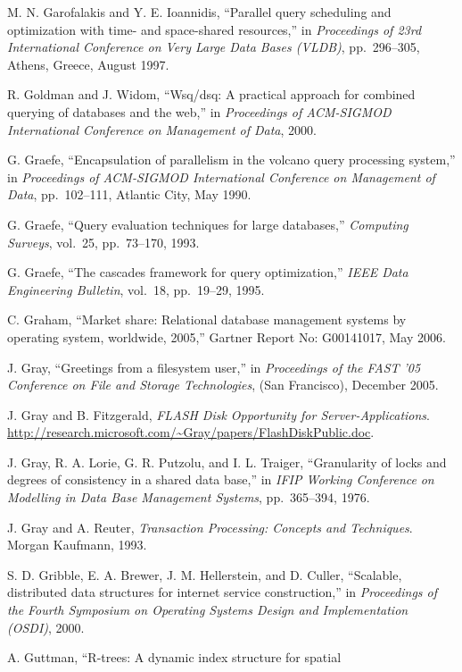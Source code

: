 \documentclass[a4paper,11pt,twoside,openright]{book}
\begin{document}
\begin{enumerate}[label={[\arabic*]}]
  M. N. Garofalakis and Y. E. Ioannidis, ``Parallel query scheduling and
  optimization with time- and space-shared resources,'' in
  \emph{Proceedings of 23rd International Conference on Very Large Data
  Bases (VLDB)}, pp.~296--305, Athens, Greece, August 1997.
\item
  R. Goldman and J. Widom, ``Wsq/dsq: A practical approach for combined
  querying of databases and the web,'' in \emph{Proceedings of
  ACM-SIGMOD International Conference on Management of Data}, 2000.
\item
  G. Graefe, ``Encapsulation of parallelism in the volcano query
  processing system,'' in \emph{Proceedings of ACM-SIGMOD International
  Conference on Management of Data}, pp.~102--111, Atlantic City, May
  1990.
\item
  G. Graefe, ``Query evaluation techniques for large databases,''
  \emph{Computing Surveys}, vol.~25, pp.~73--170, 1993.
\item
  G. Graefe, ``The cascades framework for query optimization,''
  \emph{IEEE Data Engineering Bulletin}, vol.~18, pp.~19--29, 1995.
\item
  C. Graham, ``Market share: Relational database management systems by
  operating system, worldwide, 2005,'' Gartner Report No: G00141017, May
  2006.
\item
  J. Gray, ``Greetings from a filesystem user,'' in \emph{Proceedings of
  the FAST '05} \emph{Conference on File and Storage Technologies}, (San
  Francisco), December 2005.
\item
  J. Gray and B. Fitzgerald, \emph{FLASH Disk Opportunity for
  Server-Applications}.
  \url{http://research.microsoft.com/~Gray/papers/FlashDiskPublic.doc}.
\item
  J. Gray, R. A. Lorie, G. R. Putzolu, and I. L. Traiger, ``Granularity
  of locks and degrees of consistency in a shared data base,'' in
  \emph{IFIP Working Conference} \emph{on Modelling in Data Base
  Management Systems}, pp.~365--394, 1976.
\item
  J. Gray and A. Reuter, \emph{Transaction Processing: Concepts and
  Techniques}. Morgan Kaufmann, 1993.
\item
  S. D. Gribble, E. A. Brewer, J. M. Hellerstein, and D. Culler,
  ``Scalable, distributed data structures for internet service
  construction,'' in \emph{Proceedings of the} \emph{Fourth Symposium on
  Operating Systems Design and Implementation (OSDI)}, 2000.
\item
  A. Guttman, ``R-trees: A dynamic index structure for spatial

\end{enumerate}
\end{document}
